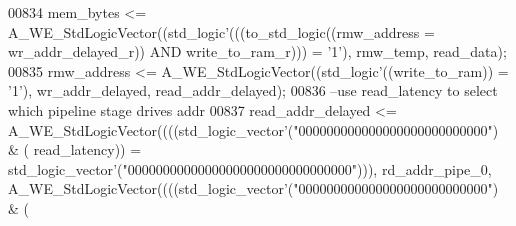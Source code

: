 \begin{DoxyCode}
00834   \textcolor{vhdlchar}{mem_bytes} \textcolor{vhdlchar}{<=} \textcolor{vhdlchar}{A\_WE\_StdLogicVector}\textcolor{vhdlchar}{(}\textcolor{vhdlchar}{(}\textcolor{comment}{std\_logic}\textcolor{vhdlchar}{'}\textcolor{vhdlchar}{(}\textcolor{vhdlchar}{(}\textcolor{vhdlchar}{(}\textcolor{vhdlchar}{to\_std\_logic}\textcolor{vhdlchar}{(}\textcolor{vhdlchar}{(}\textcolor{vhdlchar}{rmw_address} \textcolor{vhdlchar}{=} \textcolor{vhdlchar}{
      wr_addr_delayed_r}\textcolor{vhdlchar}{)}\textcolor{vhdlchar}{)} \textcolor{keywordflow}{AND} \textcolor{vhdlchar}{write_to_ram_r}\textcolor{vhdlchar}{)}\textcolor{vhdlchar}{)}\textcolor{vhdlchar}{)} \textcolor{vhdlchar}{=} \textcolor{vhdlchar}{'}\textcolor{vhdllogic}{}\textcolor{vhdllogic}{1}\textcolor{vhdlchar}{'}\textcolor{vhdlchar}{)}\textcolor{vhdlchar}{,} \textcolor{vhdlchar}{rmw_temp}\textcolor{vhdlchar}{,} \textcolor{vhdlchar}{read_data}\textcolor{vhdlchar}{)};
00835   \textcolor{vhdlchar}{rmw_address} \textcolor{vhdlchar}{<=} \textcolor{vhdlchar}{A\_WE\_StdLogicVector}\textcolor{vhdlchar}{(}\textcolor{vhdlchar}{(}\textcolor{comment}{std\_logic}\textcolor{vhdlchar}{'}\textcolor{vhdlchar}{(}\textcolor{vhdlchar}{(}\textcolor{vhdlchar}{write_to_ram}\textcolor{vhdlchar}{)}\textcolor{vhdlchar}{)} \textcolor{vhdlchar}{=} \textcolor{vhdlchar}{'}\textcolor{vhdllogic}{}\textcolor{vhdllogic}{1}\textcolor{vhdlchar}{'}\textcolor{vhdlchar}{)}\textcolor{vhdlchar}{,} \textcolor{vhdlchar}{
      wr_addr_delayed}\textcolor{vhdlchar}{,} \textcolor{vhdlchar}{read_addr_delayed}\textcolor{vhdlchar}{)};
00836 \textcolor{keyword}{  --use read\_latency to select which pipeline stage drives addr}
00837   \textcolor{vhdlchar}{read_addr_delayed} \textcolor{vhdlchar}{<=} \textcolor{vhdlchar}{A\_WE\_StdLogicVector}\textcolor{vhdlchar}{(}\textcolor{vhdlchar}{(}\textcolor{vhdlchar}{(}\textcolor{vhdlchar}{(}\textcolor{comment}{std\_logic\_vector}\textcolor{vhdlchar}{'}\textcolor{vhdlchar}{(}\textcolor{vhdllogic}{"000000000000000000000000000"}\textcolor{vhdlchar}{)} \textcolor{vhdlchar}{&} \textcolor{vhdlchar}{(}\textcolor{vhdlchar}{
      read_latency}\textcolor{vhdlchar}{)}\textcolor{vhdlchar}{)} \textcolor{vhdlchar}{=} \textcolor{comment}{std\_logic\_vector}\textcolor{vhdlchar}{'}\textcolor{vhdlchar}{(}\textcolor{vhdllogic}{"00000000000000000000000000000000"}\textcolor{vhdlchar}{)}\textcolor{vhdlchar}{)}\textcolor{vhdlchar}{)}\textcolor{vhdlchar}{,} \textcolor{vhdlchar}{
      rd_addr_pipe_0}\textcolor{vhdlchar}{,} \textcolor{vhdlchar}{A\_WE\_StdLogicVector}\textcolor{vhdlchar}{(}\textcolor{vhdlchar}{(}\textcolor{vhdlchar}{(}\textcolor{vhdlchar}{(}\textcolor{comment}{std\_logic\_vector}\textcolor{vhdlchar}{'}\textcolor{vhdlchar}{(}\textcolor{vhdllogic}{"000000000000000000000000000"}\textcolor{vhdlchar}{)} \textcolor{vhdlchar}{&} \textcolor{vhdlchar}{(}\textcolor{vhdlchar}{
}
\end{DoxyCode}
